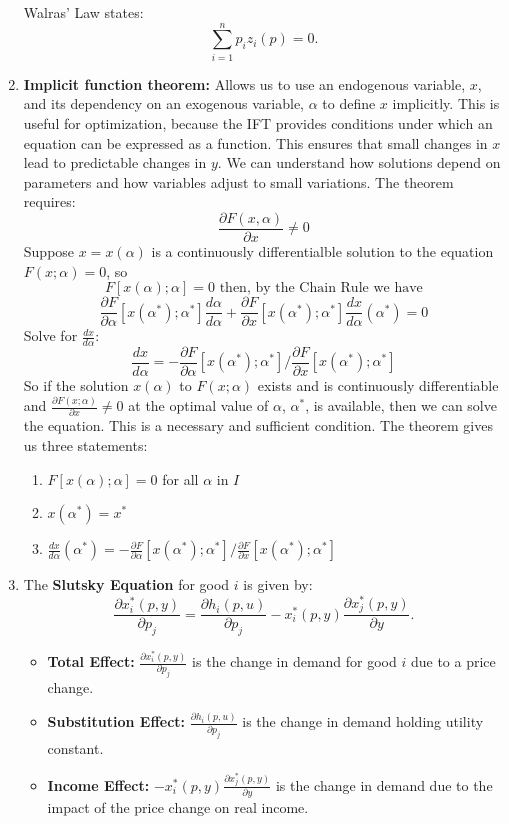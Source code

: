 \documentclass{article}
\begin{document}
\begin{enumerate}
        Walras' Law states:
        \[
        \sum_{i=1}^n p_i z_i(p) = 0.
        \]
    \item \textbf{Implicit function theorem:} Allows us to use an endogenous variable, $x$, and its dependency on an exogenous variable, $\alpha$ to define $x$ implicitly. This is useful for optimization, because the IFT provides conditions under which an equation can be expressed as a function. This ensures that small changes in \( x \) lead to predictable changes in \( y \). We can understand how solutions depend on parameters and how variables adjust to small variations. The theorem requires:
    \[
    \frac{\partial F(x, \alpha)}{\partial x} \neq 0
    \]
    Suppose $x = x(\alpha)$ is a continuously differentialble solution to the equation $F(x; \alpha) = 0$, so 
    \[
    F[x(\alpha); \alpha] = 0 \text{ then, by the Chain Rule we have}
    \]
    \[
    \frac{\partial F}{\partial \alpha}[x(\alpha^*); \alpha^*]\frac{d \alpha}{d \alpha} + \frac{\partial F}{\partial x}[x(\alpha^*); \alpha^*]\frac{dx}{d \alpha}(\alpha^*) = 0
    \]
    Solve for $\frac{d x}{d \alpha}$:
    \[
    \frac{dx}{d \alpha} = -\frac{\partial F}{\partial \alpha}[x(\alpha^*); \alpha^*]/\frac{\partial F}{\partial x}[x(\alpha^*); \alpha^*]
    \]
    So if the solution $x(\alpha)$ to $F(x;\alpha)$ exists and is continuously differentiable and $\frac{\partial F(x;\alpha)}{\partial x} \neq 0$ at the optimal value of $\alpha$, $\alpha^*$, is available, then we can solve the equation. This is a necessary and sufficient condition. The theorem gives us three statements:
    \begin{enumerate}
        \item $F[x(\alpha); \alpha] = 0$ for all $\alpha$ in $I$
        \item $x(\alpha^*) = x^*$
        \item $\frac{dx}{d \alpha}(\alpha^*) = -\frac{\partial F}{\partial \alpha}[x(\alpha^*); \alpha^*]/\frac{\partial F}{\partial x}[x(\alpha^*); \alpha^*]$
    \end{enumerate}
    \item The \textbf{Slutsky Equation} for good \( i \) is given by:
        \[
        \frac{\partial x_i^*(p, y)}{\partial p_j} = \frac{\partial h_i(p, u)}{\partial p_j} - x_i^*(p, y) \frac{\partial x_j^*(p, y)}{\partial y}.
        \]
        
        \begin{itemize}
            \item \textbf{Total Effect:} \( \frac{\partial x_i^*(p, y)}{\partial p_j} \) is the change in demand for good \( i \) due to a price change.
            \item \textbf{Substitution Effect:} \( \frac{\partial h_i(p, u)}{\partial p_j} \) is the change in demand holding utility constant.
            \item \textbf{Income Effect:} \( -x_i^*(p, y) \frac{\partial x_j^*(p, y)}{\partial y} \) is the change in demand due to the impact of the price change on real income.
        \end{itemize}
\end{enumerate}
\end{document}
